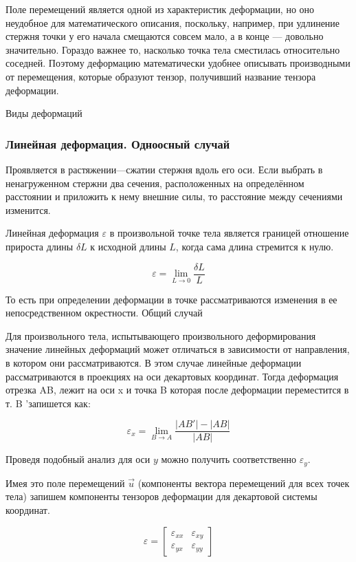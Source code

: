 Поле перемещений является одной из характеристик деформации, но оно неудобное для математического описания, поскольку, например, при удлинение стержня точки у его начала смещаются совсем мало, а в конце — довольно значительно. Гораздо важнее то, насколько точка тела сместилась относительно соседней. Поэтому деформацию математически удобнее описывать производными от перемещения, которые образуют тензор, получивший название тензора деформации.

Виды деформаций
\subsubsection{Линейная деформация. Одноосный случай}

Проявляется в растяжении—сжатии стержня вдоль его оси. Если выбрать в ненагруженном стержни два сечения, расположенных на определённом расстоянии и приложить к нему внешние силы, то расстояние между сечениями изменится.

Линейная деформация $\varepsilon$ в произвольной точке тела является границей отношение прироста длины $\delta L$ к исходной длины $L$, когда сама длина стремится к нулю.

\[ \varepsilon = \lim_{L \to 0} \frac{{\delta} {L}} {L} \]

То есть при определении деформации в точке рассматриваются изменения в ее непосредственном окрестности.
Общий случай

Для произвольного тела, испытывающего произвольного деформирования значение линейных деформаций может отличаться в зависимости от направления, в котором они рассматриваются. В этом случае линейные деформации рассматриваются в проекциях на оси декартовых координат. Тогда деформация отрезка AB, лежит на оси x и точка B которая после деформации переместится в т. B 'запишется как:

\[ \varepsilon_x = \lim_{B \to A} {\frac{| AB '| - | AB |}{| AB |}} \]

Проведя подобный анализ для оси $y$ можно получить соответственно $\varepsilon_y$.

Имея это поле перемещений $\overrightarrow u$ (компоненты вектора перемещений для всех точек тела) запишем компоненты тензоров деформации для декартовой системы координат.

\[ \varepsilon = \left [{\begin {matrix} 
{\varepsilon_{xx}} & {\varepsilon_{xy}} \\ 
{\varepsilon_{yx}} & {\varepsilon_{yy}} 
\end{matrix}} \right] \]

